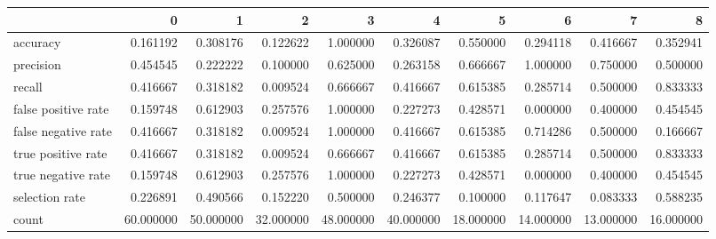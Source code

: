 \begin{tabular}{lrrrrrrrrr}
\toprule
{} &          0 &          1 &          2 &          3 &          4 &          5 &          6 &          7 &          8 \\
\midrule
accuracy            &   0.161192 &   0.308176 &   0.122622 &   1.000000 &   0.326087 &   0.550000 &   0.294118 &   0.416667 &   0.352941 \\
precision           &   0.454545 &   0.222222 &   0.100000 &   0.625000 &   0.263158 &   0.666667 &   1.000000 &   0.750000 &   0.500000 \\
recall              &   0.416667 &   0.318182 &   0.009524 &   0.666667 &   0.416667 &   0.615385 &   0.285714 &   0.500000 &   0.833333 \\
false positive rate &   0.159748 &   0.612903 &   0.257576 &   1.000000 &   0.227273 &   0.428571 &   0.000000 &   0.400000 &   0.454545 \\
false negative rate &   0.416667 &   0.318182 &   0.009524 &   1.000000 &   0.416667 &   0.615385 &   0.714286 &   0.500000 &   0.166667 \\
true positive rate  &   0.416667 &   0.318182 &   0.009524 &   0.666667 &   0.416667 &   0.615385 &   0.285714 &   0.500000 &   0.833333 \\
true negative rate  &   0.159748 &   0.612903 &   0.257576 &   1.000000 &   0.227273 &   0.428571 &   0.000000 &   0.400000 &   0.454545 \\
selection rate      &   0.226891 &   0.490566 &   0.152220 &   0.500000 &   0.246377 &   0.100000 &   0.117647 &   0.083333 &   0.588235 \\
count               &  60.000000 &  50.000000 &  32.000000 &  48.000000 &  40.000000 &  18.000000 &  14.000000 &  13.000000 &  16.000000 \\
\bottomrule
\end{tabular}
